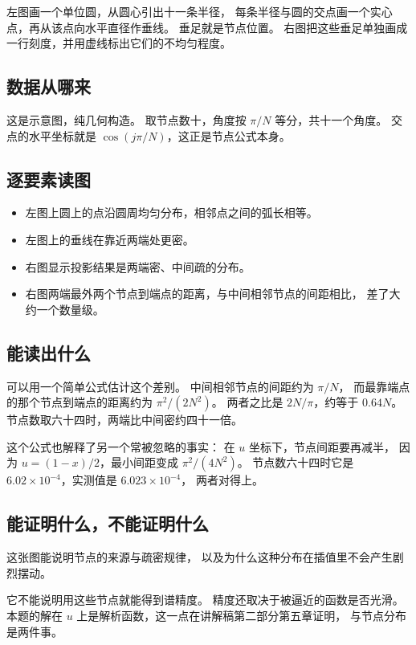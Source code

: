 \documentclass[11pt,a4paper]{article}
\begin{document}
左图画一个单位圆，从圆心引出十一条半径，
每条半径与圆的交点画一个实心点，再从该点向水平直径作垂线。
垂足就是节点位置。
右图把这些垂足单独画成一行刻度，并用虚线标出它们的不均匀程度。

\subsection{数据从哪来}

这是示意图，纯几何构造。
取节点数十，角度按 $\pi/N$ 等分，共十一个角度。
交点的水平坐标就是 $\cos(j\pi/N)$，这正是节点公式本身。

\subsection{逐要素读图}

\begin{itemize}[leftmargin=1.6em]
\item 左图上圆上的点沿圆周均匀分布，相邻点之间的弧长相等。
\item 左图上的垂线在靠近两端处更密。
\item 右图显示投影结果是两端密、中间疏的分布。
\item 右图两端最外两个节点到端点的距离，与中间相邻节点的间距相比，
      差了大约一个数量级。
\end{itemize}

\subsection{能读出什么}

可以用一个简单公式估计这个差别。
中间相邻节点的间距约为 $\pi/N$，
而最靠端点的那个节点到端点的距离约为 $\pi^2/(2N^2)$。
两者之比是 $2N/\pi$，约等于 $0.64N$。
节点数取六十四时，两端比中间密约四十一倍。

这个公式也解释了另一个常被忽略的事实：
在 $u$ 坐标下，节点间距要再减半，
因为 $u=(1-x)/2$，最小间距变成 $\pi^2/(4N^2)$。
节点数六十四时它是 $6.02\times10^{-4}$，实测值是 $6.023\times10^{-4}$，
两者对得上。

\subsection{能证明什么，不能证明什么}

这张图能说明节点的来源与疏密规律，
以及为什么这种分布在插值里不会产生剧烈摆动。

它不能说明用这些节点就能得到谱精度。
精度还取决于被逼近的函数是否光滑。
本题的解在 $u$ 上是解析函数，这一点在讲解稿第二部分第五章证明，
与节点分布是两件事。
\end{document}
